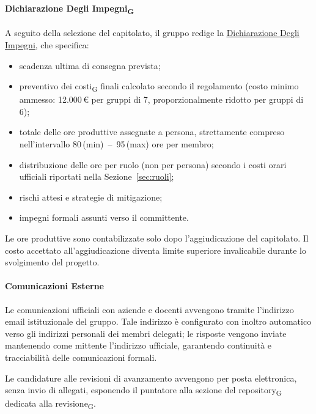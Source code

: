 \paragraph{Dichiarazione Degli Impegni\textsubscript{G}}
A seguito della selezione del capitolato, il gruppo redige la
\href{https://synergo-unit-unipd.github.io/Second-Brain/docs/CC/doc_gestionali/doc_esterni/dichiarazione_degli_impegni/dichiarazione_degli_impegni.pdf}
     {\underline{Dichiarazione Degli Impegni}},
che specifica:

\begin{itemize}
  \item scadenza ultima di consegna prevista;
  \item preventivo dei costi\textsubscript{G} finali calcolato secondo il
        regolamento (costo minimo ammesso: 12.000\,€ per gruppi di 7,
        proporzionalmente ridotto per gruppi di 6);
  \item totale delle ore produttive assegnate a persona, strettamente compreso
        nell'intervallo 80\,(min)~--~95\,(max) ore per membro;
  \item distribuzione delle ore per ruolo (non per persona) secondo i costi orari
        ufficiali riportati nella Sezione~\ref{sec:ruoli};
  \item rischi attesi e strategie di mitigazione;
  \item impegni formali assunti verso il committente.
\end{itemize}

Le ore produttive sono contabilizzate solo dopo l'aggiudicazione del capitolato.
Il costo accettato all'aggiudicazione diventa limite superiore invalicabile durante
lo svolgimento del progetto.

\paragraph{Comunicazioni Esterne}
Le comunicazioni ufficiali con aziende e docenti avvengono tramite l'indirizzo email
istituzionale del gruppo. Tale indirizzo è configurato con inoltro automatico verso
gli indirizzi personali dei membri delegati; le risposte vengono inviate mantenendo
come mittente l'indirizzo ufficiale, garantendo continuità e tracciabilità delle
comunicazioni formali. 

Le candidature alle revisioni di avanzamento avvengono per
posta elettronica, senza invio di allegati, esponendo il puntatore alla sezione del
repository\textsubscript{G} dedicata alla revisione\textsubscript{G}.

